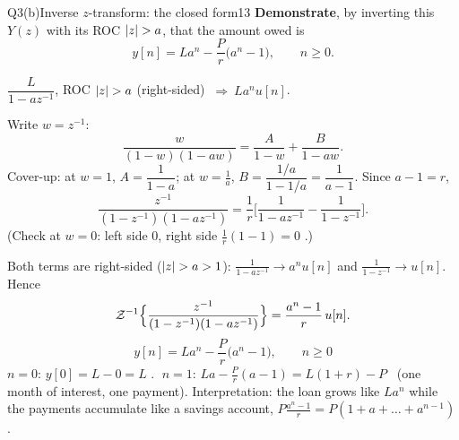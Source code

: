 \begin{qcard}{Q3(b)}{Inverse $z$-transform: the closed form}{13}
\textbf{Demonstrate}, by inverting this $Y(z)$ with its ROC $\lvert z\rvert>a$, that the amount owed is
\[y[n]=La^n-\frac Pr\big(a^n-1\big),\qquad n\ge0 .\]
\end{qcard}
\begin{solution}
 $\dfrac{L}{1-az^{-1}}$, ROC $\lvert z\rvert>a$ (right-sided) $\ \Longrightarrow\ La^nu[n]$.

 Write $w=z^{-1}$:
\[\frac{w}{(1-w)(1-aw)}=\frac{A}{1-w}+\frac{B}{1-aw}.\]
Cover-up: at $w=1$, $A=\dfrac{1}{1-a}$; at $w=\frac1a$, $B=\dfrac{1/a}{1-1/a}=\dfrac1{a-1}$. Since $a-1=r$,
\[\frac{z^{-1}}{(1-z^{-1})(1-az^{-1})}=\frac1r\Big[\frac{1}{1-az^{-1}}-\frac1{1-z^{-1}}\Big].\]
(Check at $w=0$: left side $0$, right side $\frac1r(1-1)=0$ \checkmark.)

 Both terms are right-sided ($\lvert z\rvert>a>1$): $\frac1{1-az^{-1}}\to a^nu[n]$ and $\frac1{1-z^{-1}}\to u[n]$. Hence
\[\mathcal{Z}^{-1}\Big\{\frac{z^{-1}}{(1-z^{-1})(1-az^{-1})}\Big\}=\frac{a^n-1}{r}\,u[n].\]
\[\boxed{y[n]=La^n-\frac Pr\big(a^n-1\big),\qquad n\ge0}\]
 $n=0$: $y[0]=L-0=L$ \checkmark. $\;n=1$: $La-\frac Pr(a-1)=L(1+r)-P$ \checkmark\ (one month of interest, one payment). Interpretation: the loan grows like $La^n$ while the payments accumulate like a savings account, $P\frac{a^n-1}{r}=P(1+a+\dots+a^{n-1})$.
\end{solution}

